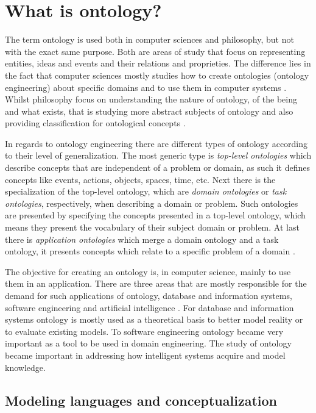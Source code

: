 \section{What is ontology?}

The term ontology is used both in computer sciences and philosophy, but not with the exact same purpose. Both are areas of study that focus on representing entities, ideas and events and their relations and proprieties. The difference lies in the fact that computer sciences mostly studies how to create ontologies (ontology engineering) about specific domains and to use them in computer systems \citep{gruber2009ontology}. Whilst philosophy focus on understanding the nature of ontology, of the being and what exists, that is studying more abstract subjects of ontology and also providing classification for ontological concepts \citep{guizzardi_ontological_2005}.

In regards to ontology engineering there are different types of ontology according to their level of generalization. The most generic type is \textit{top-level ontologies} which describe concepts that are independent of a problem or domain, as such it defines concepts like events, actions, objects, spaces, time, etc. Next there is the specialization of the top-level ontology, which are \textit{domain ontologies} or \textit{task ontologies}, respectively, when describing a domain or problem. Such ontologies are presented by specifying the concepts presented in a top-level ontology, which means they present the vocabulary of their subject domain or problem. At last there is \textit{application ontologies} which merge a domain ontology and a task ontology, it presents concepts which relate to a specific problem of a domain \citep{guarino1998ontoformal}.

The objective for creating an ontology is, in computer science, mainly to use them in an application. There are three areas that are mostly responsible for the demand for such applications of ontology, database and information systems, software engineering and artificial intelligence \citep{smith2001ontology}. For database and information systems ontology is mostly used as a theoretical basis to better model reality or to evaluate existing models. To software engineering ontology became very important as a tool to be used in domain engineering. The study of ontology became important in addressing how intelligent systems acquire and model knowledge.

\subsection{Modeling languages and conceptualization}

